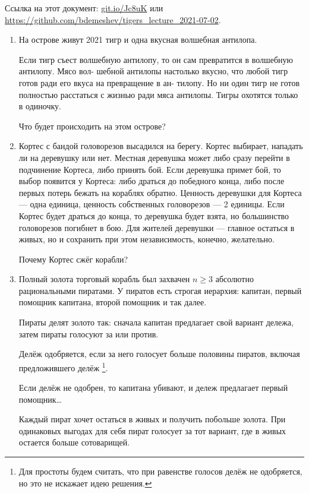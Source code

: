 \documentclass[12pt]{article} %
\theoremstyle{definition} %
\begin{document}
Ссылка на этот документ: \url{git.io/Jc8uK} или \url{https://github.com/bdemeshev/tigers_lecture_2021-07-02}.


\begin{enumerate}

\item На острове живут 2021 тигр и одна вкусная волшебная антилопа.

Если тигр съест волшебную антилопу, то он сам превратится в волшебную антилопу. 
Мясо вол-
шебной антилопы настолько вкусно, что любой тигр готов ради его вкуса на превращение в ан-
тилопу. Но ни один тигр не готов полностью расстаться с жизнью ради мяса антилопы. 
Тигры охотятся только в одиночку.

Что будет происходить на этом острове?

\item Кортес с бандой головорезов высадился на берегу. 
Кортес выбирает, нападать ли на деревушку или нет. 
Местная деревушка может либо сразу перейти в подчинение Кортеса, либо принять бой.
Если деревушка примет бой, то выбор появится у Кортеса: либо драться до победного конца, либо
после первых потерь бежать на кораблях обратно. 
Ценность деревушки для Кортеса — одна единица, ценность собственных головорезов — 2 единицы. 
Если Кортес будет драться до конца, то деревушка будет взята, но большинство головорезов погибнет в бою. 
Для жителей деревушки — главное остаться в живых, но и сохранить при этом независимость, конечно, желательно.

Почему Кортес сжёг корабли?


\item Полный золота торговый корабль был захвачен $n \geq 3$ абсолютно рациональными пиратами.
У пиратов есть строгая иерархия: капитан, первый помощник капитана, второй помощник и так далее.

Пираты делят золото так: сначала капитан предлагает свой вариант дележа, затем пираты голосуют за или против.

Делёж одобряется, если за него голосует больше половины пиратов, включая предложившего делёж
\footnote{Для простоты будем считать, что при равенстве голосов делёж не одобряется, но это не искажает идею решения.}.

Если делёж не одобрен, то капитана убивают, и дележ предлагает первый помощник\ldots

Каждый пират хочет остаться в живых и получить побольше золота. 
При одинаковых выгодах для себя пират голосует за тот вариант, где в живых остается больше сотоварищей.


\end{enumerate}
\end{document}
